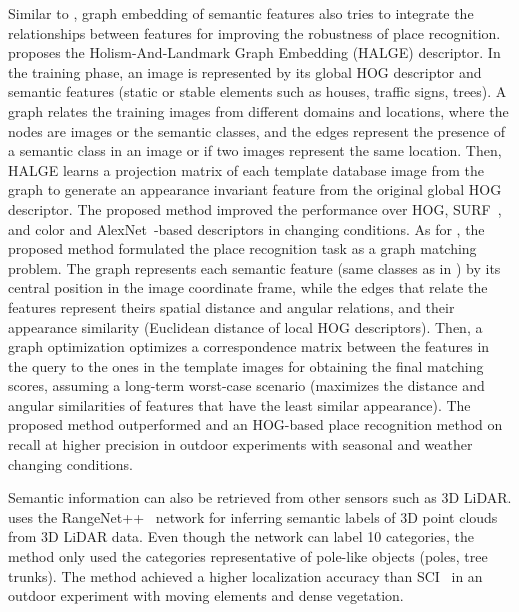 Similar to \cite{singh-et-al:2021:9564866}, graph embedding of semantic features also tries to integrate the relationships between features for improving the robustness of place recognition.
\cite{han-et-al:2018:2856274} proposes the Holism-And-Landmark Graph Embedding (HALGE) descriptor. In the training phase, an image is represented by its global HOG descriptor and semantic features (static or stable elements such as houses, traffic signs, trees).
A graph relates the training images from different domains and locations, where the nodes are images or the semantic classes, and the edges represent the presence of a semantic class in an image or if two images represent the same location.
Then, HALGE learns a projection matrix of each template database image from the graph to generate an appearance invariant feature from the original global HOG descriptor. The proposed method improved the performance over HOG, SURF~\parencite{original:surf}, and color and AlexNet~\parencite{original:alexnet}-based descriptors in changing conditions.
As for \cite{gao-zhang:2020:9196906}, the proposed method formulated the place recognition task as a graph matching problem. The graph represents each semantic feature (same classes as in \cite{singh-et-al:2021:9564866}) by its central position in the image coordinate frame, while the edges that relate the features represent theirs spatial distance and angular relations, and their appearance similarity (Euclidean distance of local HOG descriptors). Then, a graph optimization optimizes a correspondence matrix between the features in the query to the ones in the template images for obtaining the final matching scores, assuming a long-term worst-case scenario (maximizes the distance and angular similarities of features that have the least similar appearance).
The proposed method outperformed \cite{han-et-al:2018:3} and an HOG-based place recognition method on recall at higher precision in outdoor experiments with seasonal and weather changing conditions.

Semantic information can also be retrieved from other sensors such as 3D LiDAR. \cite{wang-et-al:2021:9739599} uses the RangeNet++~\parencite{original:rangenet} network for inferring semantic labels of 3D point clouds from 3D LiDAR data. Even though the network can label 10 categories, the method only used the categories representative of pole-like objects (poles, tree trunks). The method achieved a higher localization accuracy than SCI~\parencite{kim-et-al:2019:2897340} in an outdoor experiment with moving elements and dense vegetation.


